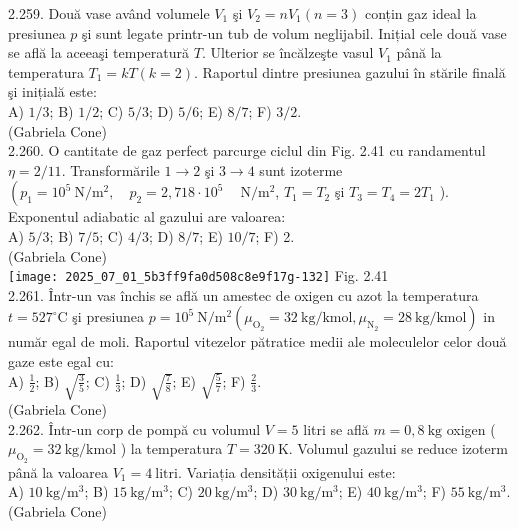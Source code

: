 2.259. Două vase având volumele $V_{1}$ şi $V_{2}=n V_{1}(n=3)$ conțin gaz ideal la presiunea $p$ şi sunt legate printr-un tub de volum neglijabil. Inițial cele două vase se află la aceeaşi temperatură $T$. Ulterior se încălzeşte vasul $V_{1}$ până la temperatura $T_{1}=k T(k=2)$. Raportul dintre presiunea gazului în stările finală şi inițială este:\\ A) $1 / 3$; B) $1 / 2$; C) $5 / 3$; D) $5 / 6$; E) $8 / 7$; F) $3 / 2$.\\ (Gabriela Cone)\\

2.260. O cantitate de gaz perfect parcurge ciclul din Fig. 2.41 cu randamentul $\eta=2 / 11$. Transformările $1 \rightarrow 2$ şi $3 \rightarrow 4$ sunt izoterme $\left(p_{1}=10^{5} \mathrm{~N} / \mathrm{m}^{2}, \quad p_{2}=2,718 \cdot 10^{5} \quad \mathrm{~N} / \mathrm{m}^{2}\right.$, $T_{1}=T_{2}$ şi $T_{3}=T_{4}=2 T_{1}$ ). Exponentul adiabatic al gazului are valoarea:\\ A) $5 / 3$; B) $7 / 5$; C) $4 / 3$; D) $8 / 7$; E) $10 / 7$; F) 2.\\ (Gabriela Cone)\\ \texttt{[image: 2025\_07\_01\_5b3ff9fa0d508c8e9f17g-132]} Fig. 2.41\\

2.261. Într-un vas închis se află un amestec de oxigen cu azot la temperatura $t=527^{\circ} \mathrm{C}$ şi presiunea $p=10^{5} \mathrm{~N} / \mathrm{m}^{2}\left(\mu_{\mathrm{O}_{2}}=32 \mathrm{~kg} / \mathrm{kmol}, \mu_{\mathrm{N}_{2}}=28 \mathrm{~kg} / \mathrm{kmol}\right)$ in număr egal de moli. Raportul vitezelor pătratice medii ale moleculelor celor două gaze este egal cu:\\ A) $\frac{1}{2}$; B) $\sqrt{\frac{3}{5}}$; C) $\frac{1}{3}$; D) $\sqrt{\frac{7}{8}}$; E) $\sqrt{\frac{5}{7}}$; F) $\frac{2}{3}$.\\ (Gabriela Cone)\\

2.262. Într-un corp de pompă cu volumul $V=5$ litri se află $m=0,8 \mathrm{~kg}$ oxigen ( $\mu_{\mathrm{O}_{2}}=32 \mathrm{~kg} / \mathrm{kmol}$ ) la temperatura $T=320 \mathrm{~K}$. Volumul gazului se reduce izoterm până la valoarea $V_{1}=4 \mathrm{~litri}$. Variația densității oxigenului este:\\ A) $10 \mathrm{~kg} / \mathrm{m}^{3}$; B) $15 \mathrm{~kg} / \mathrm{m}^{3}$; C) $20 \mathrm{~kg} / \mathrm{m}^{3}$; D) $30 \mathrm{~kg} / \mathrm{m}^{3}$; E) $40 \mathrm{~kg} / \mathrm{m}^{3}$; F) $55 \mathrm{~kg} / \mathrm{m}^{3}$.\\ (Gabriela Cone)\\

